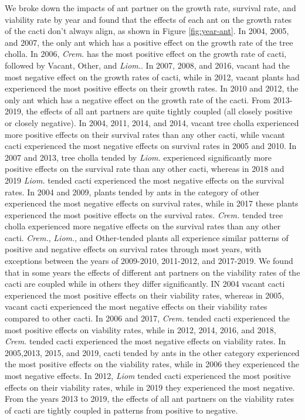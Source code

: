 \documentclass[12pt,a4paper]{article}
\begin{document}
We broke down the impacts of ant partner on the growth rate, survival rate, and viability rate by year and found that the effects of each ant on the growth rates of the cacti don’t always align, as shown in Figure \ref{fig:year-ant}. 
In 2004, 2005, and 2007, the only ant which has a positive effect on the growth rate of the tree cholla. 
In 2006, \textit{Crem.} has the most positive effect on the growth rate of cacti, followed by Vacant, Other, and \textit{Liom.}. 
In 2007, 2008, and 2016, vacant had the most negative effect on the growth rates of cacti, while in 2012, vacant plants had experienced the most positive effects on their growth rates. 
In 2010 and 2012, the only ant which has a negative effect on the growth rate of the cacti. 
From 2013-2019, the effects of all ant partners are quite tightly coupled (all closely positive or closely negative). 
In 2004, 2011, 2014, and 2014, vacant tree cholla experienced more positive effects on their survival rates than any other cacti, while vacant cacti experienced the most negative effects on survival rates in 2005 and 2010.
In 2007 and 2013, tree cholla tended by \textit{Liom.} experienced significantly more positive effects on the survival rate than any other cacti, whereas in 2018 and 2019 \textit{Liom.} tended cacti experienced the most negative effects on the survival rates. 
In 2004 and 2009, plants tended by ants in the category of other experienced the most negative effects on survival rates, while in 2017 these plants experienced the most positive effects on the survival rates. 
\textit{Crem.} tended tree cholla experienced more negative effects on the survival rates than any other cacti. 
\textit{Crem.}, \textit{Liom.}, and Other-tended plants all experience similar patterns of positive and negative effects on survival rates through most years, with exceptions between the years of 2009-2010, 2011-2012, and 2017-2019. 
We found that in some years the effects of different ant partners on the viability rates of the cacti are coupled while in others they differ significantly. 
IN 2004 vacant cacti experienced the most positive effects on their viability rates, whereas in 2005, vacant cacti experienced the most negative effects on their viability rates compared to other cacti. 
In 2006 and 2017, \textit{Crem.} tended cacti experienced the most positive effects on viability rates, while in 2012, 2014, 2016, and 2018, \textit{Crem.} tended cacti experienced the most negative effects on viability rates. 
In 2005,2013, 2015, and 2019, cacti tended by ants in the other category experienced the most positive effects on the viability rates, while in 2006 they experienced the most negative effects. 
In 2012, \textit{Liom} tended cacti experienced the most positive effects on their viability rates, while in 2019 they experienced the most negative. 
From the years 2013 to 2019, the effects of all ant partners on the viability rates of cacti are tightly coupled in patterns from positive to negative. 
\end{document}
